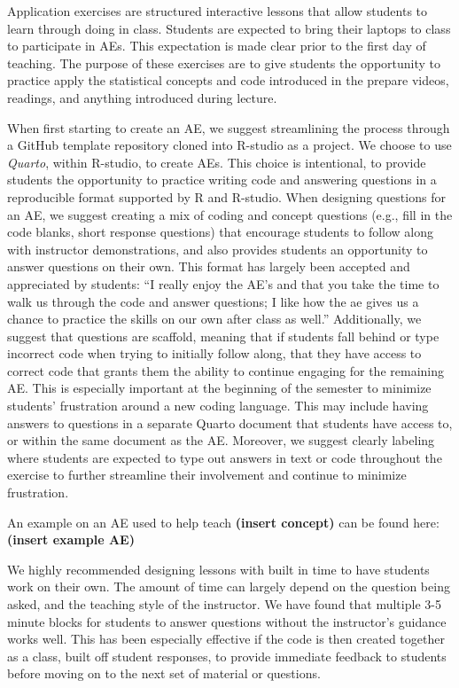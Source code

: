 \documentclass[
  12pt]{article}
\begin{document}
Application exercises are structured interactive lessons that allow
students to learn through doing in class. Students are expected to bring
their laptops to class to participate in AEs. This expectation is made
clear prior to the first day of teaching. The purpose of these exercises
are to give students the opportunity to practice apply the statistical
concepts and code introduced in the prepare videos, readings, and
anything introduced during lecture.

When first starting to create an AE, we suggest streamlining the process
through a GitHub template repository cloned into R-studio as a project.
We choose to use \emph{Quarto}, within R-studio, to create AEs. This
choice is intentional, to provide students the opportunity to practice
writing code and answering questions in a reproducible format supported
by R and R-studio. When designing questions for an AE, we suggest
creating a mix of coding and concept questions (e.g., fill in the code
blanks, short response questions) that encourage students to follow
along with instructor demonstrations, and also provides students an
opportunity to answer questions on their own. This format has largely
been accepted and appreciated by students: ``I really enjoy the AE's and
that you take the time to walk us through the code and answer questions;
I like how the ae gives us a chance to practice the skills on our own
after class as well.'' Additionally, we suggest that questions are
scaffold, meaning that if students fall behind or type incorrect code
when trying to initially follow along, that they have access to correct
code that grants them the ability to continue engaging for the remaining
AE. This is especially important at the beginning of the semester to
minimize students' frustration around a new coding language. This may
include having answers to questions in a separate Quarto document that
students have access to, or within the same document as the AE.
Moreover, we suggest clearly labeling where students are expected to
type out answers in text or code throughout the exercise to further
streamline their involvement and continue to minimize frustration.

An example on an AE used to help teach \textbf{(insert concept)} can be
found here: \textbf{(insert example AE)}

We highly recommended designing lessons with built in time to have
students work on their own. The amount of time can largely depend on the
question being asked, and the teaching style of the instructor. We have
found that multiple 3-5 minute blocks for students to answer questions
without the instructor's guidance works well. This has been especially
effective if the code is then created together as a class, built off
student responses, to provide immediate feedback to students before
moving on to the next set of material or questions.
\end{document}
